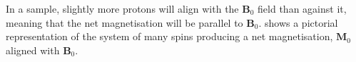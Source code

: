 In a sample, slightly more protons will align with the $\mathbf{B}_0$ field than against it, meaning that the net magnetisation will be parallel to $\mathbf{B}_0$. 
 shows a pictorial representation of the system of many spins producing a net magnetisation, $\mathbf{M}_0$ aligned with $\mathbf{B}_0$.

